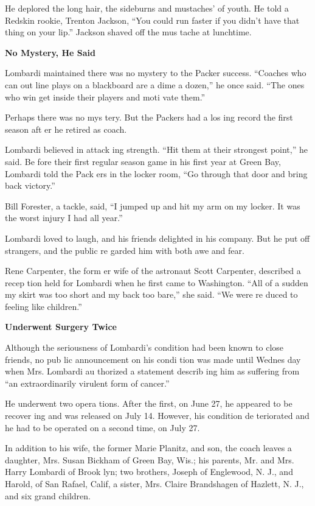 He deplored the long hair, the sideburns and mustaches' of youth. He
told a Redskin rookie, Trenton Jackson, ``You could run faster if you
didn't have that thing on your lip.'' Jackson shaved off the mus tache
at lunchtime.

\textbf{No Mystery, He Said}

Lombardi maintained there was no mystery to the Packer success.
``Coaches who can out line plays on a blackboard are a dime a dozen,''
he once said. ``The ones who win get inside their players and moti vate
them.''

Perhaps there was no mys tery. But the Packers had a los ing record the
first season aft er he retired as coach.

Lombardi believed in attack ing strength. ``Hit them at their strongest
point,'' he said. Be fore their first regular season game in his first
year at Green Bay, Lombardi told the Pack ers in the locker room, ``Go
through that door and bring back victory.''

Bill Forester, a tackle, said, ``I jumped up and hit my arm on my
locker. It was the worst injury I had all year.''

Lombardi loved to laugh, and his friends delighted in his company. But
he put off strangers, and the public re garded him with both awe and
fear.

Rene Carpenter, the form er wife of the astronaut Scott Carpenter,
described a recep tion held for Lombardi when he first came to
Washington. ``All of a sudden my skirt was too short and my back too
bare,'' she said. ``We were re duced to feeling like children.''

\textbf{Underwent Surgery Twice}

Although the seriousness of Lombardi's condition had been known to close
friends, no pub lic announcement on his condi tion was made until Wednes
day when Mrs. Lombardi au thorized a statement describ ing him as
suffering from ``an extraordinarily virulent form of cancer.''

He underwent two opera tions. After the first, on June 27, he appeared
to be recover ing and was released on July 14. However, his condition de
teriorated and he had to be operated on a second time, on July 27.

In addition to his wife, the former Marie Planitz, and son, the coach
leaves a daughter, Mrs. Susan Bickham of Green Bay, Wis.; his parents,
Mr. and Mrs. Harry Lombardi of Brook lyn; two brothers, Joseph of
Englewood, N. J., and Harold, of San Rafael, Calif, a sister, Mrs.
Claire Brandshagen of Hazlett, N. J., and six grand children.

